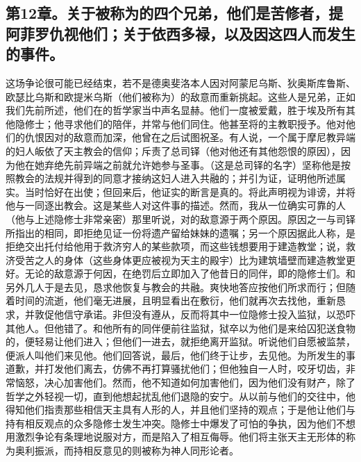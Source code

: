 
\subsection{第12章。关于被称为的四个兄弟，他们是苦修者，提阿菲罗仇视他们；关于依西多禄，以及因这四人而发生的事件。}

这场争论很可能已经结束，若不是德奥斐洛本人因对阿蒙尼乌斯、狄奥斯库鲁斯、欧瑟比乌斯和欧提米乌斯（他们被称为）的敌意而重新挑起。这些人是兄弟，正如我们先前所述，他们在的哲学家当中声名显赫。他们一度被爱戴，胜于埃及所有其他隐修士；他寻求他们的陪伴，并常与他们同住。他甚至将的主教职授予。他对他们的仇恨因对的敌意而加深，他曾在之后试图祝圣。有人说，一个属于摩尼教异端的妇人皈依了天主教会的信仰；斥责了总司铎（他对他还有其他怨恨的原因），因为他在她弃绝先前异端之前就允许她参与圣事。（这是总司铎的名字）坚称他是按照教会的法规并得到的同意才接纳这妇人进入共融的；并引为证，证明他所述属实。当时恰好在出使；但回来后，他证实的断言是真的。将此声明视为诽谤，并将他与一同逐出教会。这是某些人对这件事的描述。然而，我从一位确实可靠的人（他与上述隐修士非常亲密）那里听说，对的敌意源于两个原因。原因之一与司铎所指出的相同，即拒绝见证一份将遗产留给妹妹的遗嘱；另一个原因据此人称，是拒绝交出托付给他用于救济穷人的某些款项，而这些钱想要用于建造教堂；说，救济受苦之人的身体（这些身体更应被视为天主的殿宇）比为建筑墙壁而建造教堂更好。无论的敌意源于何因，在绝罚后立即加入了他昔日的同伴，即的隐修士们。和另外几人于是去见，恳求他恢复与教会的共融。爽快地答应按他们所求而行；但随着时间的流逝，他们毫无进展，且明显看出在敷衍，他们就再次去找他，重新恳求，并敦促他信守承诺。非但没有遵从，反而将其中一位隐修士投入监狱，以恐吓其他人。但他错了。和他所有的同伴便前往监狱，狱卒以为他们是来给囚犯送食物的，便轻易让他们进入；但他们一进去，就拒绝离开监狱。听说他们自愿被监禁，便派人叫他们来见他。他们回答说，最后，他们终于让步，去见他。为所发生的事道歉，并打发他们离去，仿佛不再打算骚扰他们；但他独自一人时，咬牙切齿，非常恼怒，决心加害他们。然而，他不知道如何加害他们，因为他们没有财产，除了哲学之外轻视一切，直到他想起扰乱他们退隐的安宁。从以前与他们的交往中，他得知他们指责那些相信天主具有人形的人，并且他们坚持的观点；于是他让他们与持有相反观点的众多隐修士发生冲突。隐修士中爆发了可怕的争执，因为他们不想用激烈争论有条理地说服对方，而是陷入了相互侮辱。他们将主张天主无形体的称为奥利振派，而持相反意见的则被称为神人同形论者。\par

